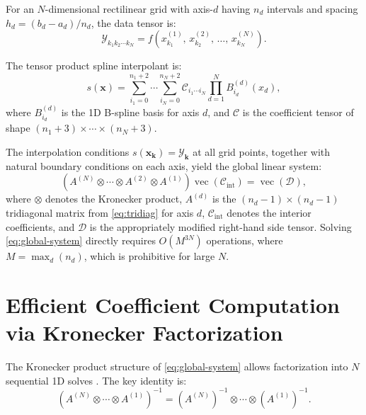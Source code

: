 \documentclass[11pt,a4paper]{article}
\begin{document}
For an $N$-dimensional rectilinear grid with axis-$d$ having $n_d$
intervals and spacing $h_d = (b_d - a_d) / n_d$, the data tensor is:
\begin{equation}\label{eq:data-tensor}
  \mathcal{Y}_{k_1 k_2 \cdots k_N}
  = f\!\left(x^{(1)}_{k_1},\, x^{(2)}_{k_2},\, \ldots,\, x^{(N)}_{k_N}\right).
\end{equation}

The tensor product spline interpolant is:
\begin{equation}\label{eq:tensor-spline}
  s(\mathbf{x})
  = \sum_{i_1=0}^{n_1+2} \cdots \sum_{i_N=0}^{n_N+2}
    \mathcal{C}_{i_1 \cdots i_N}
    \prod_{d=1}^{N} B^{(d)}_{i_d}(x_d),
\end{equation}
where $B^{(d)}_{i_d}$ is the 1D B-spline basis for axis $d$, and
$\mathcal{C}$ is the coefficient tensor of shape
$(n_1+3) \times \cdots \times (n_N+3)$.

The interpolation conditions $s(\mathbf{x}_{\mathbf{k}}) = \mathcal{Y}_{\mathbf{k}}$
at all grid points, together with natural boundary conditions on each axis,
yield the global linear system:
\begin{equation}\label{eq:global-system}
  \left(A^{(N)} \otimes \cdots \otimes A^{(2)} \otimes A^{(1)}\right)
  \operatorname{vec}(\mathcal{C}_{\mathrm{int}})
  = \operatorname{vec}(\mathcal{D}),
\end{equation}
where $\otimes$ denotes the Kronecker product, $A^{(d)}$ is the
$(n_d - 1) \times (n_d - 1)$ tridiagonal matrix from \eqref{eq:tridiag}
for axis $d$, $\mathcal{C}_{\mathrm{int}}$ denotes the interior
coefficients, and $\mathcal{D}$ is the appropriately modified right-hand
side tensor. Solving \eqref{eq:global-system} directly requires
$O(M^{3N})$ operations, where $M = \max_d(n_d)$, which is prohibitive
for large $N$.

\section{Efficient Coefficient Computation via Kronecker Factorization}

The Kronecker product structure of \eqref{eq:global-system} allows
factorization into $N$ sequential 1D solves \cite{Habermann2007}. The key
identity is:
\begin{equation}\label{eq:kron-inv}
  \left(A^{(N)} \otimes \cdots \otimes A^{(1)}\right)^{-1}
  = \left(A^{(N)}\right)^{-1} \otimes \cdots \otimes \left(A^{(1)}\right)^{-1}.
\end{equation}
\end{document}
